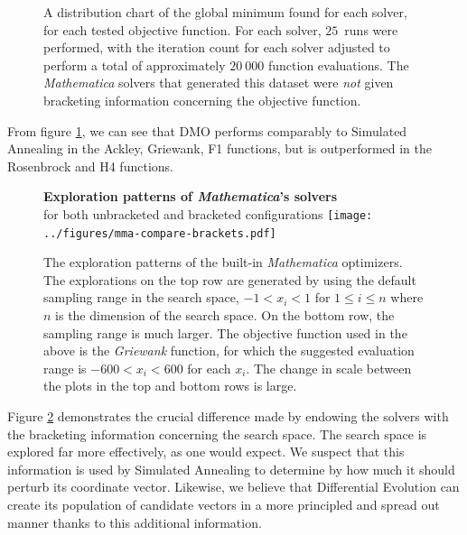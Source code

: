 \documentclass[12pt]{article}
\begin{document}
\begin{figure}[H]
\begin{center}
        \caption{
            A distribution chart of the global minimum found for each
            solver, for each tested objective function. For each solver,
            $25$~runs were performed, with the iteration count for each
            solver adjusted to perform a total of approximately $20~000$
            function evaluations. The \emph{Mathematica} solvers that
            generated this dataset were \emph{not} given bracketing
            information concerning the objective function.
        }
        \label{fig:bad-data}
    \end{center}
\end{figure}

From figure \ref{fig:bad-data}, we can see that DMO performs comparably to
Simulated Annealing in the Ackley, Griewank, F1 functions, but is
outperformed in the Rosenbrock and H4 functions.

\begin{figure}[H]
    \begin{center}
        {\large {\bfseries Exploration patterns of \emph{Mathematica}'s solvers}\\
        for both unbracketed and bracketed configurations}
        \texttt{[image: ../figures/mma-compare-brackets.pdf]}
        \caption{The exploration patterns of the built-in
        \emph{Mathematica} optimizers. The explorations on the top row are
            generated by using the default sampling range in the search
            space, $-1 < x_i < 1$ for $1 \leq i \leq n$ where $n$ is the
            dimension of the search space. On the bottom row, the sampling
            range is much larger. The objective function used in the above
            is the \emph{Griewank} function, for which the suggested
            evaluation range is $-600 < x_i < 600$ for each
            $x_i$\cite{griewank1981}. The change in scale between the plots
            in the top and bottom rows is large. %
        }
        \label{fig:exploration}
    \end{center}
\end{figure}

Figure \ref{fig:exploration} demonstrates the crucial difference made by
endowing the solvers with the bracketing information concerning the search
space. The search space is explored far more effectively, as one would
expect. We suspect that this information is used by Simulated Annealing to
determine by how much it should perturb its coordinate vector. Likewise, we
believe that Differential Evolution can create its population of candidate
vectors in a more principled and spread out manner thanks to this
additional information.
\end{document}
